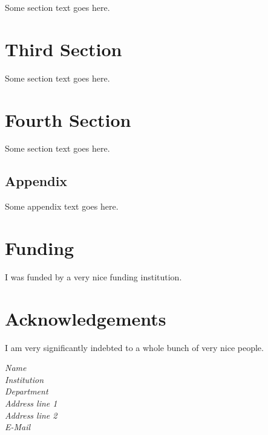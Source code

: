 \documentclass[12pt,english]{article}
\numberwithin{equation}{section}
\begin{document}
Some section text goes here.

\section{Third Section}

Some section text goes here.

\section{Fourth Section}

Some section text goes here.

\begin{appendices}

\section{Appendix}

Some appendix text goes here.

\end{appendices}

\section*{Funding}

I was funded by a very nice funding institution.

\section*{Acknowledgements}

I am very significantly indebted to a whole bunch of very nice
people.

\begin{flushright}
\emph{
  Name\\
  Institution\\
  Department\\
  Address line 1\\
  Address line 2\\
  E-Mail
}
\end{flushright}


{}
\end{document}
